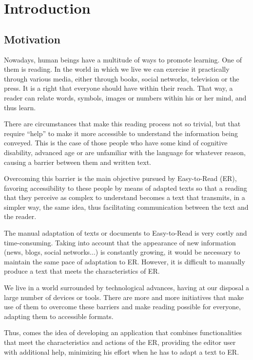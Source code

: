\chapter{Introduction}
\label{cap:introduction}

\section{Motivation}
Nowadays, human beings have a multitude of ways to promote learning. One of them is reading. In the world in which we live we can exercise it practically through various media, either through books, social networks, television or the press. It is a right that everyone should have within their reach. That way, a reader can relate words, symbols, images or numbers within his or her mind, and thus learn.

There are circumstances that make this reading process not so trivial, but that require ``help'' to make it more accessible to understand the information being conveyed. This is the case of those people who have some kind of cognitive disability, advanced age or are unfamiliar with the language for whatever reason, causing a barrier between them and written text.

Overcoming this barrier is the main objective pursued by Easy-to-Read (ER), favoring accessibility to these people by means of adapted texts so that a reading that they perceive as complex to understand becomes a text that transmits, in a simpler way, the same idea, thus facilitating communication between the text and the reader.


The manual adaptation of texts or documents to Easy-to-Read is very costly and time-consuming. Taking into account that the appearance of new information (news, blogs, social networks...) is constantly growing, it would be necessary to maintain the same pace of adaptation to ER. However, it is difficult to manually produce a text that meets the characteristics of ER. 

We live in a world surrounded by technological advances, having at our disposal a large number of devices or tools. There are more and more initiatives that make use of them to overcome these barriers and make reading possible for everyone, adapting them to accessible formats. 


Thus, comes the idea of developing an application that combines functionalities that meet the characteristics and actions of the ER, providing the editor user with additional help, minimizing his effort when he has to adapt a text to ER.


